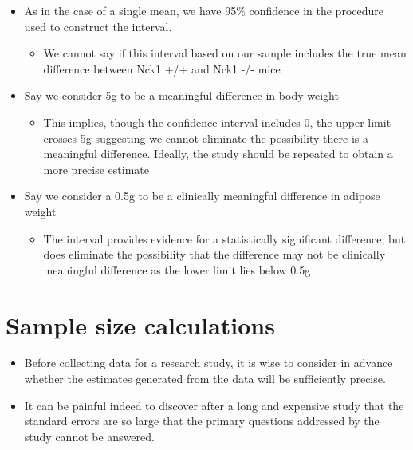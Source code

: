 \documentclass[
]{book}
\providecommand{\tightlist}{%
  \setlength{\itemsep}{0pt}\setlength{\parskip}{0pt}}
\begin{document}
\begin{itemize}
\tightlist
\item
  As in the case of a single mean, we have 95\% confidence in the procedure used to construct the interval.

  \begin{itemize}
  \tightlist
  \item
    We cannot say if this interval based on our sample includes the true mean difference between Nck1 +/+ and Nck1 -/- mice
  \end{itemize}
\item
  Say we consider 5g to be a meaningful difference in body weight

  \begin{itemize}
  \tightlist
  \item
    This implies, though the confidence interval includes 0, the upper limit crosses 5g suggesting we cannot eliminate the possibility there is a meaningful difference. Ideally, the study should be repeated to obtain a more precise estimate
  \end{itemize}
\item
  Say we consider a 0.5g to be a clinically meaningful difference in adipose weight

  \begin{itemize}
  \tightlist
  \item
    The interval provides evidence for a statistically significant difference, but does eliminate the possibility that the difference may not be clinically meaningful difference as the lower limit lies below 0.5g
  \end{itemize}
\end{itemize}

\hypertarget{sample-size-calculations}{%
\section{Sample size calculations}\label{sample-size-calculations}}

\begin{itemize}
\tightlist
\item
  Before collecting data for a research study, it is wise to consider in advance whether the estimates generated from the data will be sufficiently precise.
\item
  It can be painful indeed to discover after a long and expensive study that the standard errors are so large that the primary questions addressed by the study cannot be answered.
\end{itemize}
\end{document}
